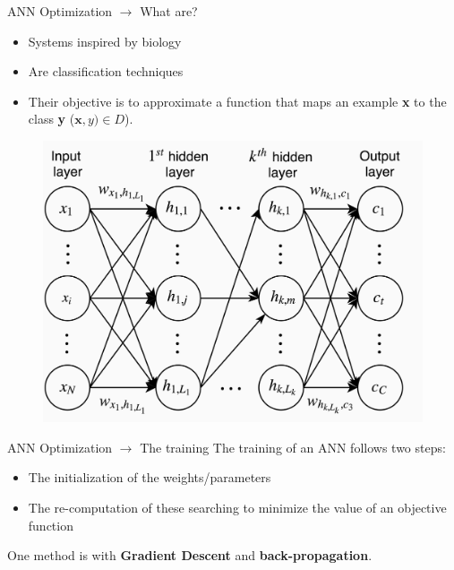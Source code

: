 \documentclass[xcolor={usenames}]{beamer}
\begin{document}
  \begin{frame}{ANN Optimization \(\rightarrow\) What are?}
  	\begin{minipage}{0.4\textwidth}
  		\begin{itemize}
  			\item{Systems inspired by biology}
  			\item{Are classification techniques}
  			\item{Their objective is to approximate a function that maps an example \textbf{x} to the class \textbf{y} ($\textbf{x}, y) \in D$).}
  		\end{itemize}
  	\end{minipage}
  	\begin{minipage}{0.58\textwidth}
  		\begin{figure}[t]
			\centering
			\includegraphics[width=\textwidth]{../figures/multi-layer-perceptron-3.png}
		\end{figure}	
  	\end{minipage}
  \end{frame}
  \begin{frame}{ANN Optimization \(\rightarrow\) The training}
  	The training of an ANN follows two steps:
  	\begin{itemize}
  		\item{The initialization of the weights/parameters}
		\item{The re-computation of these searching to minimize the value of an objective function}
  	\end{itemize}
  	One method is with \textbf{Gradient Descent} and \textbf{back-propagation}.
  \end{frame}
\end{document}
